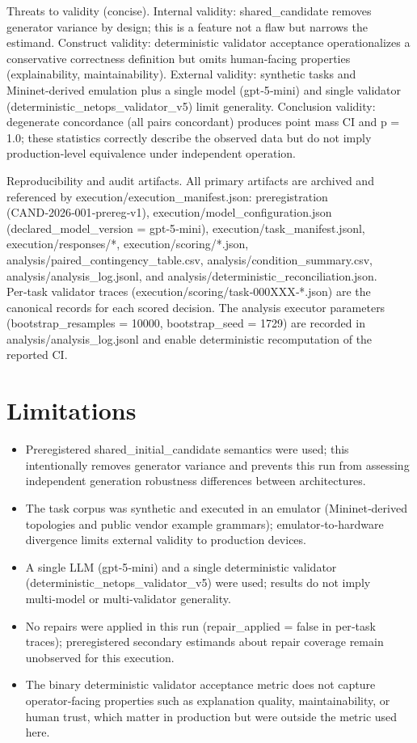 \documentclass[conference]{IEEEtran}
\begin{document}
Threats to validity (concise). Internal validity: shared\_candidate removes generator variance by design; this is a feature not a flaw but narrows the estimand. Construct validity: deterministic validator acceptance operationalizes a conservative correctness definition but omits human‑facing properties (explainability, maintainability). External validity: synthetic tasks and Mininet‑derived emulation plus a single model (gpt‑5‑mini) and single validator (deterministic\_netops\_validator\_v5) limit generality. Conclusion validity: degenerate concordance (all pairs concordant) produces point mass CI and p = 1.0; these statistics correctly describe the observed data but do not imply production‑level equivalence under independent operation.

Reproducibility and audit artifacts. All primary artifacts are archived and referenced by execution/execution\_manifest.json: preregistration (CAND‑2026‑001‑prereg‑v1), execution/model\_configuration.json (declared\_model\_version = gpt‑5‑mini), execution/task\_manifest.jsonl, execution/responses/*, execution/scoring/*.json, analysis/paired\_contingency\_table.csv, analysis/condition\_summary.csv, analysis/analysis\_log.jsonl, and analysis/deterministic\_reconciliation.json. Per‑task validator traces (execution/scoring/task‑000XXX‑*.json) are the canonical records for each scored decision. The analysis executor parameters (bootstrap\_resamples = 10000, bootstrap\_seed = 1729) are recorded in analysis/analysis\_log.jsonl and enable deterministic recomputation of the reported CI.

\section{Limitations}
\begin{itemize}
\item Preregistered shared\_initial\_candidate semantics were used; this intentionally removes generator variance and prevents this run from assessing independent generation robustness differences between architectures.
\item The task corpus was synthetic and executed in an emulator (Mininet‑derived topologies and public vendor example grammars); emulator‑to‑hardware divergence limits external validity to production devices.
\item A single LLM (gpt‑5‑mini) and a single deterministic validator (deterministic\_netops\_validator\_v5) were used; results do not imply multi‑model or multi‑validator generality.
\item No repairs were applied in this run (repair\_applied = false in per‑task traces); preregistered secondary estimands about repair coverage remain unobserved for this execution.
\item The binary deterministic validator acceptance metric does not capture operator‑facing properties such as explanation quality, maintainability, or human trust, which matter in production but were outside the metric used here.
\end{itemize}
\end{document}
